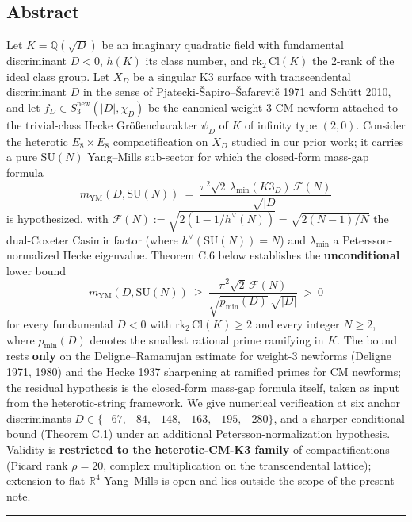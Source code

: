 \documentclass[
  11pt,
  a4paper,
]{amsart}
\begin{document}
\hypertarget{abstract}{%
\subsection{Abstract}\label{abstract}}

Let \(K = \mathbb{Q}(\sqrt{D})\) be an imaginary quadratic field with fundamental discriminant \(D < 0\), \(h(K)\) its class number, and \(\mathrm{rk}_2\, \mathrm{Cl}(K)\) the 2-rank of the ideal class group. Let \(X_D\) be a singular K3 surface with transcendental discriminant \(D\) in the sense of Pjatecki-Šapiro--Šafarevič 1971 and Schütt 2010, and let \(f_D \in S_3^{\mathrm{new}}(|D|, \chi_D)\) be the canonical weight-3 CM newform attached to the trivial-class Hecke Größencharakter \(\psi_D\) of \(K\) of infinity type \((2,0)\). Consider the heterotic \(E_8 \times E_8\) compactification on \(X_D\) studied in our prior work; it carries a pure \(\mathrm{SU}(N)\) Yang--Mills sub-sector for which the closed-form mass-gap formula
\[
m_{\mathrm{YM}}(D, \mathrm{SU}(N))\ =\ \frac{\pi^2 \sqrt{2}\, \lambda_{\min}(K3_D)\, \mathcal{F}(N)}{\sqrt{|D|}}
\]
is hypothesized, with \(\mathcal{F}(N) := \sqrt{2(1 - 1/h^{\!\vee}(N))} = \sqrt{2(N-1)/N}\) the dual-Coxeter Casimir factor (where \(h^{\!\vee}(\mathrm{SU}(N)) = N\)) and \(\lambda_{\min}\) a Petersson-normalized Hecke eigenvalue. Theorem C.6 below establishes the \textbf{unconditional} lower bound
\[
m_{\mathrm{YM}}(D, \mathrm{SU}(N))\ \ge\ \frac{\pi^2 \sqrt{2}\, \mathcal{F}(N)}{\sqrt{p_{\min}(D)}\,\sqrt{|D|}}\ >\ 0
\]
for every fundamental \(D < 0\) with \(\mathrm{rk}_2\, \mathrm{Cl}(K) \ge 2\) and every integer \(N \ge 2\), where \(p_{\min}(D)\) denotes the smallest rational prime ramifying in \(K\). The bound rests \textbf{only} on the Deligne--Ramanujan estimate for weight-3 newforms (Deligne 1971, 1980) and the Hecke 1937 sharpening at ramified primes for CM newforms; the residual hypothesis is the closed-form mass-gap formula itself, taken as input from the heterotic-string framework. We give numerical verification at six anchor discriminants \(D \in \{-67, -84, -148, -163, -195, -280\}\), and a sharper conditional bound (Theorem C.1) under an additional Petersson-normalization hypothesis. Validity is \textbf{restricted to the heterotic-CM-K3 family} of compactifications (Picard rank \(\rho = 20\), complex multiplication on the transcendental lattice); extension to flat \(\mathbb{R}^4\) Yang--Mills is open and lies outside the scope of the present note.

\begin{center}\rule{0.5\linewidth}{0.5pt}\end{center}
\end{document}
